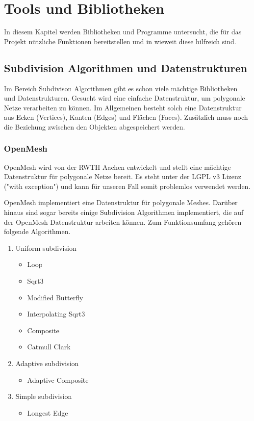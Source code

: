 \chapter{Tools und Bibliotheken}

In diesem Kapitel werden Bibliotheken und Programme untersucht, die für das Projekt nützliche Funktionen bereitstellen und
in wieweit diese hilfreich sind. 
 
\section{Subdivision Algorithmen und Datenstrukturen}

Im Bereich Subdivison Algorithmen gibt es schon viele mächtige Bibliotheken und Datenstrukturen.
Gesucht wird eine einfache Datenstruktur, um polygonale Netze verarbeiten zu können.
Im Allgemeinen besteht solch eine Datenstruktur aus Ecken (Vertices), Kanten (Edges) und Flächen (Faces).
Zusätzlich muss noch die Beziehung zwischen den Objekten abgespeichert werden.

\subsection{OpenMesh}

OpenMesh wird von der \acs{RWTH} Aachen entwickelt und stellt eine mächtige Datenstruktur für polygonale Netze bereit.
Es steht unter der \acs{LGPL} v3 Lizenz ("with exception") und kann für unseren Fall somit problemlos verwendet werden.

OpenMesh implementiert eine Datenstruktur für polygonale Meshes. Darüber hinaus sind sogar bereits einige Subdivision Algorithmen implementiert, die auf der OpenMesh Datenstruktur arbeiten können. Zum Funktionsumfang gehören folgende Algorithmen.
\begin{enumerate}
\item Uniform subdivision
\begin{itemize}
	\item Loop
	\item Sqrt3
	\item Modified Butterfly
	\item Interpolating Sqrt3
	\item Composite
	\item Catmull Clark
\end{itemize}
\item Adaptive subdivision
\begin{itemize}
	\item Adaptive Composite
\end{itemize}
\item Simple subdivision
\begin{itemize}
	\item Longest Edge
\end{itemize}
\end{enumerate}

